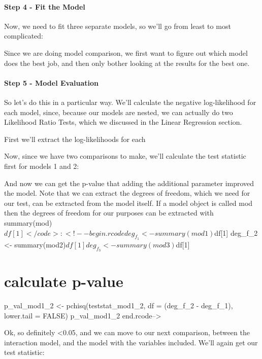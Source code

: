 \documentclass[
]{article}
\begin{document}
\hypertarget{step-4---fit-the-model}{%
\paragraph{Step 4 - Fit the Model}\label{step-4---fit-the-model}}

Now, we need to fit three separate models, so we'll go from least to
most complicated:

Since we are doing model comparison, we first want to figure out which
model does the best job, and then only bother looking at the results for
the best one.

\hypertarget{step-5---model-evaluation-1}{%
\paragraph{Step 5 - Model
Evaluation}\label{step-5---model-evaluation-1}}

So let's do this in a particular way. We'll calculate the negative
log-likelihood for each model, since, because our models are nested, we
can actually do two Likelihood Ratio Tests, which we discussed in the
Linear Regression section.

First we'll extract the log-likelihoods for each

Now, since we have two comparisons to make, we'll calculate the test
statistic first for models 1 and 2:

And now we can get the p-value that adding the additional parameter
improved the model. Note that we can extract the degrees of freedom,
which we need for our test, can be extracted from the model itself. If a
model object is called mod then the degrees of freedom for our purposes
can be extracted with
summary(mod)\(df[1]</code>: <!--begin.rcode deg_f_1 <- summary(mod1)\)df{[}1{]}
deg\_f\_2 \textless-
summary(mod2)\(df[1] deg_f_3 <- summary(mod3)\)df{[}1{]}

\hypertarget{calculate-p-value}{%
\section{calculate p-value}\label{calculate-p-value}}

p\_val\_mod1\_2 \textless- pchisq(teststat\_mod1\_2, df = (deg\_f\_2 -
deg\_f\_1), lower.tail = FALSE) p\_val\_mod1\_2
end.rcode--\textgreater{}

Ok, so definitely \textless0.05, and we can move to our next comparison,
between the interaction model, and the model with the variables
included. We'll again get our test statistic:
\end{document}

